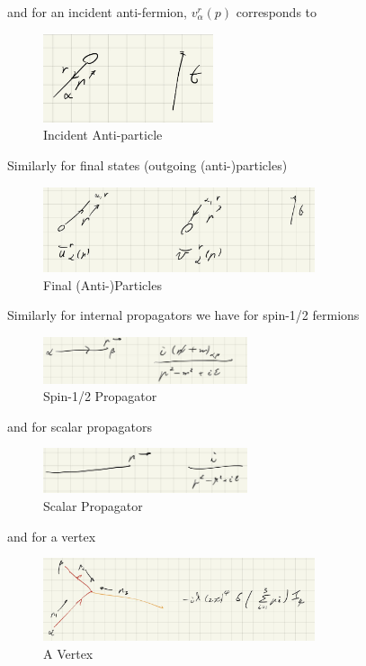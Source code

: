 \documentclass{article}
\theoremstyle{definition}
\begin{document}
and for an incident anti-fermion, $v_\alpha^r(p)$ corresponds to

\begin{figure}[H]
  \centering
  \includegraphics[width=5cm]{res/QFT/feynman_incident_anti-particle}
  \caption{Incident Anti-particle}
  \label{feynman_incident_anti-particle}
\end{figure}

Similarly for final states (outgoing (anti-)particles)

\begin{figure}[H]
\centering
\includegraphics[width=8cm]{res/QFT/feynman_final_particles}
\caption{Final (Anti-)Particles}
\label{feynman_final_particles}
\end{figure}

Similarly for internal propagators we have for spin-1/2 fermions

\begin{figure}[H]
\centering
\includegraphics[width=6cm]{res/QFT/feynman_vector_propagator}
\caption{Spin-1/2 Propagator}
\label{feynman_vector_propagator}
\end{figure}

and for scalar propagators

\begin{figure}[H]
\centering
\includegraphics[width=6cm]{res/QFT/feynman_scalar_propagator}
\caption{Scalar Propagator}
\label{feynman_scalar_propagator}
\end{figure}

and for a vertex

\begin{figure}[H]
\centering
\includegraphics[width=8cm]{res/QFT/feynman_vertex}
\caption{A Vertex}
\label{feynman_vertex}
\end{figure}
\end{document}
